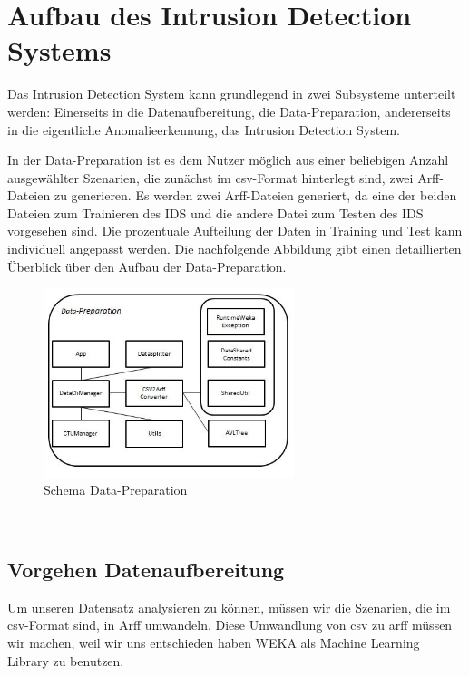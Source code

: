 \documentclass[main.tex]{subfiles}
\begin{document}
\section{Aufbau des Intrusion Detection Systems}

Das Intrusion Detection System kann grundlegend in zwei Subsysteme unterteilt werden: Einerseits in die Datenaufbereitung, die Data-Preparation, andererseits in die eigentliche Anomalieerkennung, das Intrusion Detection System.

In der Data-Preparation ist es dem Nutzer möglich aus einer beliebigen Anzahl ausgewählter Szenarien, die zunächst im csv-Format hinterlegt sind, zwei Arff-Dateien zu generieren. Es werden zwei Arff-Dateien generiert, da eine der beiden Dateien zum Trainieren des IDS und die andere Datei zum Testen des IDS vorgesehen sind. Die prozentuale Aufteilung der Daten in Training und Test kann individuell angepasst werden. Die nachfolgende Abbildung gibt einen detaillierten Überblick über den Aufbau der Data-Preparation.\\

%
\begin{figure}[ht]
 \centering
 \includegraphics[width=0.65\textwidth]{images/Schema_Data_Preparation.jpg}
 \caption{Schema Data-Preparation}
 \label{schema_data_preparation}
\end{figure}
\ \\

\subsection {Vorgehen Datenaufbereitung}

Um unseren Datensatz analysieren zu können, müssen wir die Szenarien, die im csv-Format sind, in Arff umwandeln.
Diese Umwandlung von csv zu arff müssen wir machen, weil wir uns entschieden
haben WEKA als Machine Learning Library zu benutzen.
\end{document}
